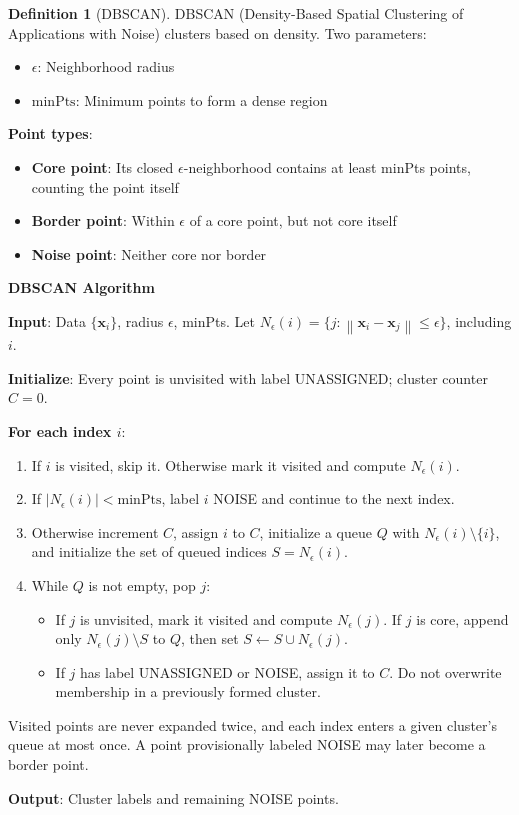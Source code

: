 \documentclass[11pt,twoside]{article}
\numberwithin{equation}{section}
\newcommand{\vect}[1]{\bm{#1}}
\newcommand{\norm}[1]{\left\lVert#1\right\rVert}
\theoremstyle{plain}
\theoremstyle{definition}
\newtheorem{definition}[theorem]{Definition}
\theoremstyle{remark}
\begin{document}
\begin{definition}[DBSCAN]
DBSCAN (Density-Based Spatial Clustering of Applications with Noise) clusters based on density. Two parameters:
\begin{itemize}
\item $\epsilon$: Neighborhood radius
\item $\text{minPts}$: Minimum points to form a dense region
\end{itemize}

\textbf{Point types}:
\begin{itemize}
\item \textbf{Core point}: Its closed $\epsilon$-neighborhood contains at least minPts points, counting the point itself
\item \textbf{Border point}: Within $\epsilon$ of a core point, but not core itself
\item \textbf{Noise point}: Neither core nor border
\end{itemize}
\end{definition}

\begin{algorithmbox}
\textbf{DBSCAN Algorithm}

\textbf{Input}: Data $\{\vect{x}_i\}$, radius $\epsilon$, minPts. Let $N_\epsilon(i)=\{j:\norm{\vect{x}_i-\vect{x}_j}\leq\epsilon\}$, including $i$.

\textbf{Initialize}: Every point is unvisited with label UNASSIGNED; cluster counter $C=0$.

\textbf{For each index $i$}:
\begin{enumerate}
\item If $i$ is visited, skip it. Otherwise mark it visited and compute $N_\epsilon(i)$.
\item If $|N_\epsilon(i)|<\text{minPts}$, label $i$ NOISE and continue to the next index.
\item Otherwise increment $C$, assign $i$ to $C$, initialize a queue $Q$ with $N_\epsilon(i)\setminus\{i\}$, and initialize the set of queued indices $S=N_\epsilon(i)$.
\item While $Q$ is not empty, pop $j$:
\begin{itemize}
\item If $j$ is unvisited, mark it visited and compute $N_\epsilon(j)$. If $j$ is core, append only $N_\epsilon(j)\setminus S$ to $Q$, then set $S\leftarrow S\cup N_\epsilon(j)$.
\item If $j$ has label UNASSIGNED or NOISE, assign it to $C$. Do not overwrite membership in a previously formed cluster.
\end{itemize}
\end{enumerate}
Visited points are never expanded twice, and each index enters a given cluster's queue at most once. A point provisionally labeled NOISE may later become a border point.

\textbf{Output}: Cluster labels and remaining NOISE points.
\end{algorithmbox}
\end{document}
